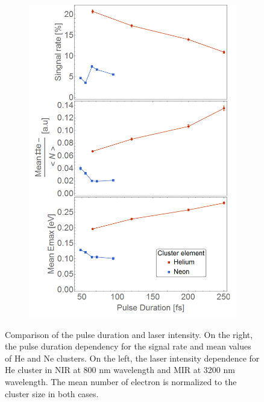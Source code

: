\begin{figure}[h!]
\begin{subfigure}[l]{0.48\textwidth}
\includegraphics[width=1\textwidth]{../Images/results/Comparison_energyDistribution/Comp_pulseduration.png} 
\end{subfigure} 

\hfill
\caption[Laser parameter comparison]{Comparison of the pulse duration and laser intensity. On the right, the pulse duration dependency for the signal rate and mean values of He and Ne clusters. On the left, the laser intensity dependence for He cluster in NIR at 800 nm wavelength and MIR at 3200 nm wavelength.  The mean number of electron is normalized to the cluster size in both cases. }
\label{fig:lasercompar}
\end{figure}

